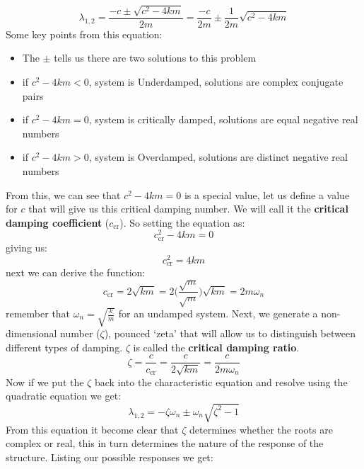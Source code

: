 \documentclass[12pt,a4paper]{article}
\begin{document}
			\begin{equation}
				\lambda_{1,2} = \frac{-c \pm \sqrt{c^2-4km}}{2m}  = \frac{-c}{2m} \pm \frac{1}{2m}\sqrt{c^2-4km}
			\end{equation}
			Some key points from this equation:
			\begin{itemize}
			\item The $\pm$ tells us there are two solutions to this problem
			\item if $c^2-4km<0$, system is Underdamped, solutions are complex conjugate pairs 
			\item if $c^2-4km=0$, system is critically damped, solutions are equal negative real numbers 
			\item if $c^2-4km>0$, system is Overdamped, solutions are distinct negative real numbers 
			\end{itemize}
			From this, we can see that $c^2-4km=0$ is a special value, let us define a value for $c$ that will give us this critical damping number. We will call it the \textbf{critical damping coefficient} ($c_{\text{cr}}$). So setting the equation as:
			\begin{equation}
				c_{\text{cr}}^2-4km = 0
			\end{equation}
			giving us: 
			\begin{equation}
				c_{\text{cr}}^2 = 4km
			\end{equation}		
			next we can derive the function:
			\begin{equation}
				c_{\text{cr}} = 2\sqrt{km} = 2\bigg(\frac{\sqrt{m}}{\sqrt{m}}\bigg)\sqrt{km} = 2m\omega_n
			\end{equation}			
			remember that $\omega_n = \sqrt{\frac{k}{m}}$ for an undamped system. Next, we generate a non-dimensional number ($\zeta$), pounced `zeta' that will allow us to distinguish between different types of damping. $\zeta$ is called the \textbf{critical damping ratio}.
			\begin{equation}
				\zeta = \frac{c}{c_{\text{cr}}} = \frac{c}{2\sqrt{km}} = \frac{c}{2m\omega_n}
			\end{equation}				
			Now if we put the $\zeta$ back into the characteristic equation and resolve using the quadratic equation we get: 
			\begin{equation}
				\lambda_{1,2} = -\zeta\omega_n \pm \omega_n \sqrt{\zeta^2-1}
			\end{equation}
			From this equation it become clear that $\zeta$ determines whether the roots are complex or real, this in turn determines the nature of the response of the structure. Listing our possible responses we get:
\end{document}
